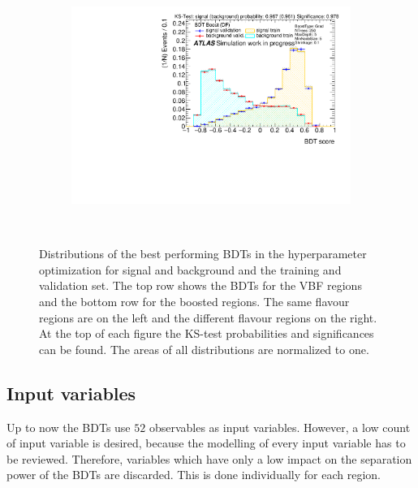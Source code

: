 \begin{figure}[htbp]
\begin{subfigure}[t]{0.49\textwidth}
    \end{subfigure}
    \begin{subfigure}[t]{0.49\textwidth}
        \includegraphics[width=\textwidth]{./plots/mva/scan/BOOST_DF_bdt_output.pdf}
    \end{subfigure}
    \caption{Distributions of the best performing BDTs in the hyperparameter optimization for signal and background and the training and validation set.
             The top row shows the BDTs for the VBF regions and the bottom row for the boosted regions.
             The same flavour regions are on the left and the different flavour regions on the right.
             At the top of each figure the KS-test probabilities and significances can be found.
             The areas of all distributions are normalized to one.}~\label{fig:mva:scan:bdts}
\end{figure}

\FloatBarrier{}

\subsection{Input variables}\label{sub:mva:input_variables}

Up to now the BDTs use $52$ observables as input variables.
However, a low count of input variable is desired, because the modelling of every input variable has to be reviewed.
Therefore, variables which have only a low impact on the separation power of the BDTs are discarded.
This is done individually for each region.

